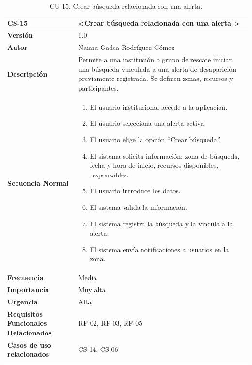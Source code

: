 \begin{table}[htbp] %
\centering
\begin{tabular}{ |m{3cm}|m{11cm}|  } 
\hline
\cellcolor[HTML]{B9E3F0}\centering\textbf{CS-15} & \cellcolor[HTML]{B9E3F0}\textbf{\textless Crear búsqueda relacionada con una alerta \textgreater}\\

\hline
\cellcolor[HTML]{EFEFEF}\textbf{Versión}             & 1.0  \\
\hline
\cellcolor[HTML]{EFEFEF}\textbf{Autor}                & Naiara Gadea Rodríguez Gómez\\
\hline
\cellcolor[HTML]{EFEFEF}\textbf{Descripción}                & {Permite a una institución o grupo de rescate iniciar una búsqueda vinculada a una alerta de desaparición previamente registrada. Se definen zonas, recursos y participantes.}\\
\hline
\cellcolor[HTML]{EFEFEF}\textbf{Secuencia \newline Normal}                &                 
        \begin{enumerate}
			\item El usuario institucional accede a la aplicación.
			\item El usuario selecciona una alerta activa.
			\item El usuario elige la opción “Crear búsqueda”.
			\item El sistema solicita información: zona de búsqueda, fecha y hora de inicio, recursos disponibles, responsables.
			\item El usuario introduce los datos.
			\item El sistema valida la información.
			\item El sistema registra la búsqueda y la vincula a la alerta.
			\item El sistema envía notificaciones a usuarios en la zona.
		\end{enumerate}\\
\hline
\cellcolor[HTML]{EFEFEF}\textbf{Frecuencia}                & Media\\
\hline
\cellcolor[HTML]{EFEFEF}\textbf{Importancia}                & Muy alta\\
\hline
\cellcolor[HTML]{EFEFEF}\textbf{Urgencia}                & Alta\\
\hline
\cellcolor[HTML]{EFEFEF}\textbf{Requisitos Funcionales Relacionados}                & {RF-02, RF-03, RF-05}\\
\hline
\cellcolor[HTML]{EFEFEF}\textbf{Casos de uso relacionados}                & {CS-14, CS-06}\\
\hline
\end{tabular}
\caption{CU-15. Crear búsqueda relacionada con una alerta.}
\end{table}

